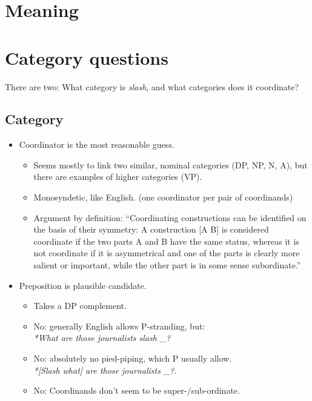 \documentclass[charis,linguex,biblatex]{glossa}
\begin{document}
\section{Meaning}

\section{Category questions}

There are two: What category is \textit{slash}, and what categories does it coordinate?

\subsection{Category}

\begin{itemize}
\item Coordinator is the most reasonable guess. 
	\begin{itemize}
\item Seems mostly to link two similar, nominal categories (DP, NP, N, A), but there are examples of higher categories (VP).
\item Monosyndetic, like English. (one coordinator per pair of coordinands)
\item Argument by definition: ``Coordinating constructions can be identified on the basis of their symmetry: A construction [A B] is considered coordinate if the two parts A and B have the same status, whereas it is not coordinate if it is asymmetrical and one of the parts is clearly more salient or important, while the other part is in some sense subordinate.'' \citep[3]{Haspelmath:2004}
\end{itemize}

\item Preposition is plausible candidate.
	\begin{itemize}
		\item Takes a DP complement.
		\item No: generally English allows P-stranding, but: \\ \textit{*What are those journalists slash \_?}
		\item No: absolutely no pied-piping, which P usually allow. \\ \textit{*[Slash what] are those journalists \_?}.
		\item No: Coordinands don't seem to be super-/sub-ordinate.
	\end{itemize}

\end{itemize}
\end{document}
